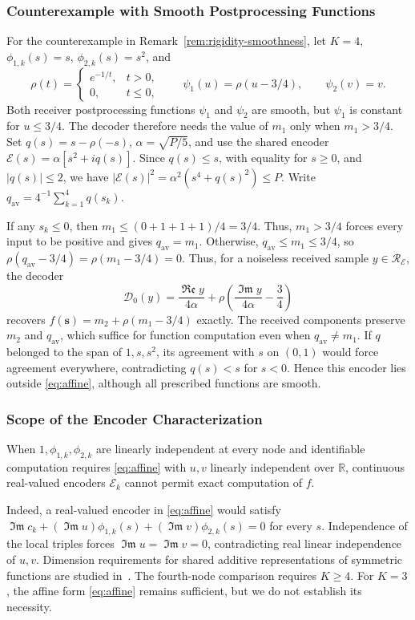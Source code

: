 \documentclass[journal,12pt,onecolumn,draftclsnofoot]{IEEEtran}
\newcommand{\enc}{\mathscr{E}}\newcommand{\dec}{\mathscr{D}}\newcommand{\R}{\mathbb R}\newcommand{\C}{\mathbb C}
\renewcommand{\Re}{\mathop{\mathfrak{Re}}\nolimits}
\renewcommand{\Im}{\mathop{\mathfrak{Im}}\nolimits}
\begin{document}
%


\subsubsection{Counterexample with Smooth Postprocessing Functions}

For the counterexample in Remark~\ref{rem:rigidity-smoothness},
let $K=4$, $\phi_{1,k}(s)=s$, $\phi_{2,k}(s)=s^2$, and
$$
 \rho(t)=
 \begin{cases}e^{-1/t},&t>0,\\0,&t\le0,\end{cases}
 \qquad
 \psi_1(u)=\rho(u-3/4),\qquad \psi_2(v)=v.
$$
Both receiver postprocessing functions $\psi_1$ and $\psi_2$ are smooth, but $\psi_1$ is constant
for $u\le3/4$. The decoder therefore needs the value of $m_1$ only
when $m_1>3/4$.
Set $q(s)=s-\rho(-s)$, $\alpha=\sqrt{P/5}$, and use the shared encoder
$\enc(s)=\alpha[s^2+iq(s)]$.
Since $q(s)\le s$, with equality for $s\ge0$, and $|q(s)|\le2$,
we have $|\enc(s)|^2=\alpha^2(s^4+q(s)^2)\le P$.
Write ${q_{\mathrm{av}}}=4^{-1}\sum_{k=1}^4q(s_k)$.

If any $s_k\le0$, then $m_1\le(0+1+1+1)/4=3/4$.
Thus, $m_1>3/4$ forces every input to be positive and gives
$q_{\mathrm{av}}=m_1$. Otherwise, $q_{\mathrm{av}}\le m_1\le3/4$,
so $\rho(q_{\mathrm{av}}-3/4)=\rho(m_1-3/4)=0$.
 Thus, for a noiseless received sample $y\in\mathcal R_\enc$, the decoder
$$
 \dec_0(y)=\frac{\Re y}{4\alpha}
 +\rho\!\left(\frac{\Im y}{4\alpha}-\frac34\right)
$$
recovers $f(\boldsymbol s)=m_2+\rho(m_1-3/4)$ exactly. The received components preserve $m_2$ and $q_{\mathrm{av}}$, which suffice for function computation even when $q_{\mathrm{av}}\ne m_1$. If $q$ belonged to the span of $1,s,s^2$, its agreement with $s$
on $(0,1)$ would force agreement everywhere, contradicting
$q(s)<s$ for $s<0$. Hence this encoder lies outside
\eqref{eq:affine}, although all prescribed functions are smooth.


\subsubsection{Scope of the Encoder Characterization}

When $1,\phi_{1,k},\phi_{2,k}$ are linearly independent
at every node and identifiable computation requires
\eqref{eq:affine} with $u,v$ linearly independent over $\R$,
continuous real-valued encoders $\mathscr E_k$ cannot permit exact computation of $f$.

Indeed, a real-valued encoder in \eqref{eq:affine} would satisfy
$\Im c_k+(\Im u)\phi_{1,k}(s)+(\Im v)\phi_{2,k}(s)=0$
for every $s$. Independence of the local triples forces
$\Im u=\Im v=0$, contradicting real linear independence of $u,v$.
 Dimension requirements for shared additive representations of symmetric functions are studied in~\cite{zaheer2017,wagstaff19,wagstaff22}. The fourth-node comparison requires $K\ge4$. For $K=3$, the affine form \eqref{eq:affine} remains sufficient, but we do not establish its necessity.
\end{document}

